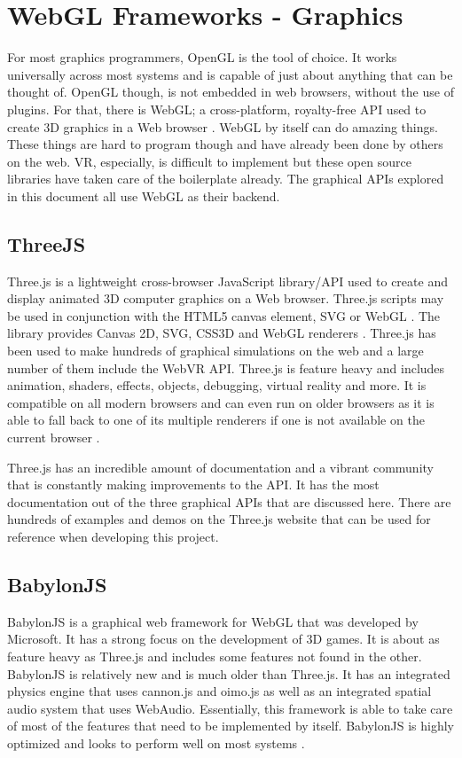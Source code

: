 \section{WebGL Frameworks - Graphics}
For most graphics programmers, OpenGL is the tool of choice. It works universally across most systems and is capable of just about anything that can be thought of. OpenGL though, is not embedded in web browsers, without the use of plugins. For that, there is WebGL; a cross-platform, royalty-free API used to create 3D graphics in a Web browser \cite{r6}. WebGL by itself can do amazing things. These things are hard to program though and have already been done by others on the web. VR, especially, is difficult to implement but these open source libraries have taken care of the boilerplate already. The graphical APIs explored in this document all use WebGL as their backend.

\subsection{ThreeJS}
Three.js is a lightweight cross-browser JavaScript library/API used to create and display animated 3D computer graphics on a Web browser. Three.js scripts may be used in conjunction with the HTML5 canvas element, SVG or WebGL \cite{r7}. The library provides Canvas 2D, SVG, CSS3D and WebGL renderers \cite{r8}. Three.js has been used to make hundreds of graphical simulations on the web and a large number of them include the WebVR API. Three.js is feature heavy and includes animation, shaders, effects, objects, debugging, virtual reality and more. It is compatible on all modern browsers and can even run on older browsers as it is able to fall back to one of its multiple renderers if one is not available on the current browser \cite{r9}.

Three.js has an incredible amount of documentation and a vibrant community that is constantly making improvements to the API. It has the most documentation out of the three graphical APIs that are discussed here. There are hundreds of examples and demos on the Three.js website that can be used for reference when developing this project. 

\subsection{BabylonJS}
BabylonJS is a graphical web framework for WebGL that was developed by Microsoft. It has a strong focus on the development of 3D games. It is about as feature heavy as Three.js and includes some features not found in the other. BabylonJS is relatively new and is much older than Three.js. It has an integrated physics engine that uses cannon.js and oimo.js as well as an integrated spatial audio system that uses WebAudio. Essentially, this framework is able to take care of most of the features that need to be implemented by itself. BabylonJS is highly optimized and looks to perform well on most systems \cite{r10}.

